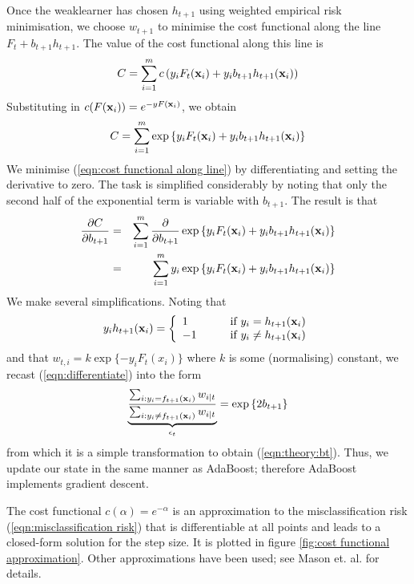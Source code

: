 Once the weaklearner has chosen $h_{t+1}$ using weighted empirical risk
minimisation, we choose $w_{t+1}$ to minimise the cost functional
along the line $F_t + b_{t+1} h_{t+1}$.  The value of the cost
functional along this line is
%
\begin{equation}
C = \sum_{i=1}^{m} c \left( y_i F_t(\mathbf{x}_i) + y_i b_{t+1}
h_{t+1}(\mathbf{x}_i) \right)
\end{equation}
%
Substituting in $c(F(\mathbf{x}_i)) = e^{-yF(\mathbf{x}_i)}$, we obtain
%
\begin{equation}
C = \sum_{i=1}^{m} \exp \left\{ y_i F_t(\mathbf{x}_i) + y_i b_{t+1}
h_{t+1}(\mathbf{x}_i) \right\}
\label{eqn:cost functional along line}
\end{equation}
%
We minimise (\ref{eqn:cost functional along line}) by
differentiating and setting the derivative to zero.  The task is
simplified considerably by noting that only the second half of the
exponential term is variable with $b_{t+1}$.  The result is that
%
\begin{eqnarray}
\label{eqn:differentiate}
\frac{\partial C}{\partial b_{t+1}} &
= & \sum_{i=1}^{m} \frac{\partial}{\partial b_{t+1}}
\exp \left\{ y_i F_t(\mathbf{x}_i) + y_i b_{t+1}
h_{t+1}(\mathbf{x}_i) \right\} \nonumber \\
& = & \sum_{i=1}^{m} y_i \exp \left\{ y_i F_t(\mathbf{x}_i) + y_i b_{t+1}
h_{t+1}(\mathbf{x}_i) \right\} 
\end{eqnarray}
%
We make several simplifications.  Noting that
%
\begin{equation}
y_i h_{t+1}(\mathbf{x}_i) = \left\{ 
	\begin{array}{ll}
	1 &	\qquad \mbox{if $y_i = h_{t+1}(\mathbf{x}_i)$} \\
	-1 &	\qquad \mbox{if $y_i \neq h_{t+1}(\mathbf{x}_i)$}
	\end{array}
\right.
\end{equation}
%
and that $w_{t,i} = k \exp \{ -y_i F_t(x_i) \}$ where $k$ is some
(normalising) constant, we recast (\ref{eqn:differentiate}) into
the form 
%
\begin{equation}
\underbrace{
	\frac{\sum_{i : y_i = f_{t+1}(\mathbf{x}_i)} w_{i|t}}
	     {\sum_{i : y_i \neq f_{t+1}(\mathbf{x}_i)} w_{i|t}}
}_{\epsilon_t}
= \exp \left\{ 2 b_{t+1} \right\} 
\end{equation}
%
from which it is a simple transformation to obtain
(\ref{eqn:theory:bt}).  Thus, we update our state in the same manner
as AdaBoost; therefore AdaBoost implements gradient descent.

The cost functional $c(\alpha) = e^{-\alpha}$ is an approximation to
the misclassification risk (\ref{eqn:misclassification risk}) that is
differentiable at all points and leads to a closed-form solution for
the step size.  It is plotted in figure \ref{fig:cost functional
approximation}.  Other approximations have been used; see Mason
et. al. \cite{Mason99} for details.

